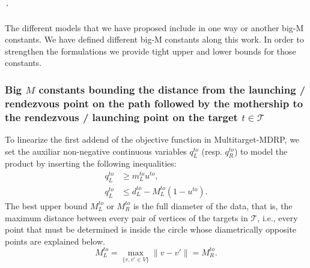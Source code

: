 \documentclass{itor}
\theoremstyle{definition}
\theoremstyle{remark}
\def\AMD{{\sf Multitarget-MDRP\xspace}}
\begin{document}


´
\bigskip

The different models that we have proposed include in one way or another big-M constants. We have defined different big-M constants along this work. In order to strengthen the formulations we provide tight upper and lower bounds for those constants. 

\subsubsection*{Big $M$ constants bounding the distance from the launching / rendezvous point on the path followed by the mothership to the rendezvous / launching point on the target $t\in \mathcal{T}$}

To linearize the first addend of the objective function in \AMD, we set the auxiliar non-negative continuous variables $q_L^{to}$ (resp. $q_R^{to}$) to model the product by inserting the following inequalities:
\begin{align*}
q_L^{to} & \geq m_L^{to} u^{to}, \\
q_L^{to} & \leq d_L^{to} - M_L^{to}(1-u^{to}).
\end{align*}
The best upper bound $M_L^{to}$ or $M_R^{to}$ is the full diameter of the data, that is, the maximum distance between every pair of vertices of the targets in $\mathcal{T}$, i.e., every point that must be determined is inside the circle whose diametrically opposite points are explained below. 
$$
M_L^{to} = \max_{\{v, v'\in V\}} \|v - v'\| = M_R^{to}.
$$
\end{document}

